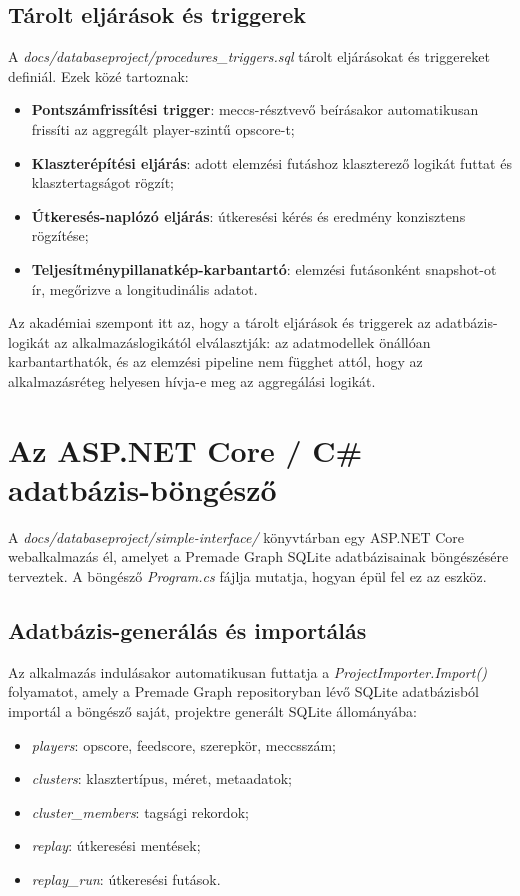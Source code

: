 \subsection{Tárolt eljárások és triggerek}

A \textit{docs/databaseproject/procedures\_triggers.sql} tárolt eljárásokat és triggereket definiál. Ezek közé tartoznak:
\begin{itemize}
    \item \textbf{Pontszámfrissítési trigger}: meccs-résztvevő beírásakor automatikusan frissíti az aggregált player-szintű opscore-t;
    \item \textbf{Klaszterépítési eljárás}: adott elemzési futáshoz klaszterező logikát futtat és klasztertagságot rögzít;
    \item \textbf{Útkeresés-naplózó eljárás}: útkeresési kérés és eredmény konzisztens rögzítése;
    \item \textbf{Teljesítménypillanatkép-karbantartó}: elemzési futásonként snapshot-ot ír, megőrizve a longitudinális adatot.
\end{itemize}

Az akadémiai szempont itt az, hogy a tárolt eljárások és triggerek az adatbázis-logikát az alkalmazáslogikától elválasztják: az adatmodellek önállóan karbantarthatók, és az elemzési pipeline nem függhet attól, hogy az alkalmazásréteg helyesen hívja-e meg az aggregálási logikát.

\section{Az ASP.NET Core / C\# adatbázis-böngésző}

A \textit{docs/databaseproject/simple-interface/} könyvtárban egy ASP.NET Core webalkalmazás él, amelyet a Premade Graph SQLite adatbázisainak böngészésére terveztek. A böngésző \textit{Program.cs} fájlja mutatja, hogyan épül fel ez az eszköz.

\subsection{Adatbázis-generálás és importálás}

Az alkalmazás indulásakor automatikusan futtatja a \textit{ProjectImporter.Import()} folyamatot, amely a Premade Graph repositoryban lévő SQLite adatbázisból importál a böngésző saját, projektre generált SQLite állományába:

\begin{itemize}
    \item \textit{players}: opscore, feedscore, szerepkör, meccsszám;
    \item \textit{clusters}: klasztertípus, méret, metaadatok;
    \item \textit{cluster\_members}: tagsági rekordok;
    \item \textit{replay}: útkeresési mentések;
    \item \textit{replay\_run}: útkeresési futások.
\end{itemize}

